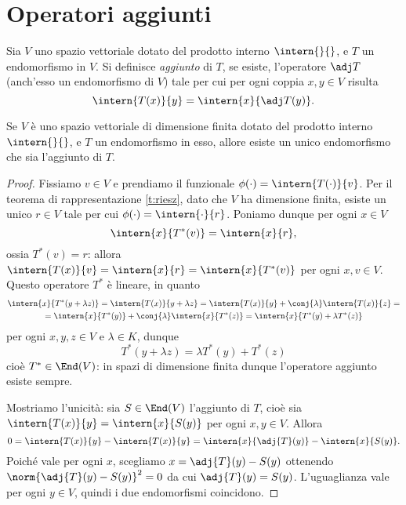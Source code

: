 \section{Operatori aggiunti}
\begin{definizione} \label{d:aggiunto}
	Sia $V$ uno spazio vettoriale dotato del prodotto interno $\intern{}{}$, e $T$ un endomorfismo in $V$.
	Si definisce \emph{aggiunto} di $T$, se esiste, l'operatore $\adj T$ (anch'esso un endomorfismo di $V$) tale per cui per ogni coppia $  x,  y\in V$ risulta
	\begin{equation*}
		\intern{T(  x)}{  y}=\intern{  x}{\adj T(  y)}.
	\end{equation*}
\end{definizione}
\begin{teorema} \label{t:unicita-aggiunto}
	Se $V$ è uno spazio vettoriale di dimensione finita dotato del prodotto interno $\intern{}{}$, e $T$ un endomorfismo in esso, allore esiste un unico endomorfismo che sia l'aggiunto di $T$.
\end{teorema}
\begin{proof}
	Fissiamo $v\in V$ e prendiamo il funzionale $\phi(\cdot)=\intern{T(\cdot)}{v}$.
	Per il teorema di rappresentazione \ref{t:riesz}, dato che $V$ ha dimensione finita, esiste un unico $r\in V$ tale per cui $\phi(\cdot)=\intern{\cdot}{r}$.
	Poniamo dunque per ogni $x\in V$
	\begin{equation}
		\intern{x}{T^*(v)}=\intern{x}{r},
	\end{equation}
	ossia $T^*(v)=r$: allora $\intern{T(x)}{v}=\intern{x}{r}=\intern{x}{T^*(v)}$ per ogni $x,v\in V$.
	Questo operatore $T^*$ è lineare, in quanto
	\begin{multline}
		\intern{x}{T^*(y+\lambda z)}=\intern{T(x)}{y+\lambda z}=\intern{T(x)}{y}+\conj{\lambda}\intern{T(x)}{z}=\\
		=\intern{x}{T^*(y)}+\conj{\lambda}\intern{x}{T^*(z)}=\intern{x}{T^*(y)+\lambda T^*(z)}
	\end{multline}
	per ogni $x,y,z\in V$ e $\lambda\in K$, dunque
	\begin{equation}
		T^*(y+\lambda z)=\lambda T^*(y)+T^*(z)
	\end{equation}
	cioè $T^*\in\End(V)$: in spazi di dimensione finita dunque l'operatore aggiunto esiste sempre.

	Mostriamo l'unicità: sia $S\in\End(V)$ l'aggiunto di $T$, cioè sia $\intern{T(x)}{y}=\intern{x}{S(y)}$ per ogni $x,y\in V$.
	Allora
	\begin{equation}
		0=\intern{T(x)}{y}-\intern{T(x)}{y}=\intern{x}{\adj{T}(y)}-\intern{x}{S(y)}.
	\end{equation}
	Poich\'e vale per ogni $x$, scegliamo $x=\adj{T}(y)-S(y)$ ottenendo $\norm{\adj{T}(y)-S(y)}^2=0$ da cui $\adj{T}(y)=S(y)$.
	L'uguaglianza vale per ogni $y\in V$, quindi i due endomorfismi coincidono.
\end{proof}
